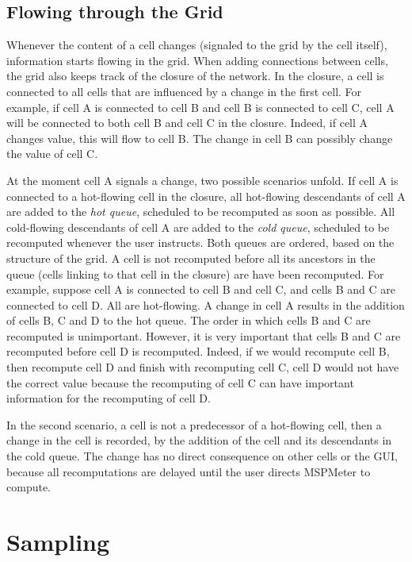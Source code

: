 \documentclass{article}
\begin{document}
\subsection{Flowing through the Grid}

Whenever the content of a cell changes (signaled to the grid by the cell itself), information starts flowing in the grid. When adding connections between cells, the grid also keeps track of the closure of the network. In the closure, a cell is connected to all cells that are influenced by a change in the first cell. For example, if cell A is connected to cell B and cell B is connected to cell C, cell A will be connected to both cell B and cell C in the closure. Indeed, if cell A changes value, this will flow to cell B. The change in cell B can possibly change the value of cell C. 

At the moment cell A signals a change, two possible scenarios unfold. If cell A is connected to a hot-flowing cell in the closure, all hot-flowing descendants of cell A are added to the \emph{hot queue}, scheduled to be recomputed as soon as possible. All cold-flowing descendants of cell A are added to the \emph{cold queue}, scheduled to be recomputed whenever the user instructs. Both queues are ordered, based on the structure of the grid. A cell is not recomputed before all its ancestors in the queue (cells linking to that cell in the closure) are have been recomputed. For example, suppose cell A is connected to cell B and cell C, and cells B and C are connected to cell D. All are hot-flowing. A change in cell A results in the addition of cells B, C and D to the hot queue. The order in which cells B and C are recomputed is unimportant. However, it is very important that cells B and C are recomputed before cell D is recomputed. Indeed, if we would recompute cell B, then recompute cell D and finish with recomputing cell C, cell D would not have the correct value because the recomputing of cell C can have important information for the recomputing of cell D. 

In the second scenario, a cell is not a predecessor of a hot-flowing cell, then a change in the cell is recorded, by the addition of the cell and its descendants in the cold queue. The change has no direct consequence on other cells or the GUI, because all recomputations are delayed until the user directs MSPMeter to compute.



\section{Sampling}
\end{document}
